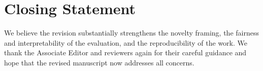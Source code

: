 \section{Closing Statement}

We believe the revision substantially strengthens the novelty framing, the fairness and interpretability of the evaluation, and the reproducibility of the work. We thank the Associate Editor and reviewers again for their careful guidance and hope that the revised manuscript now addresses all concerns.
